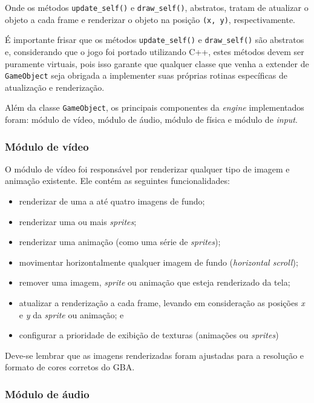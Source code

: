     Onde os métodos \texttt{update\_self()} e \texttt{draw\_self()}, abstratos, tratam de atualizar o objeto a cada frame e renderizar o objeto na posição \texttt{(x, y)}, respectivamente.

    É importante frisar que os métodos \texttt{update\_self()} e \texttt{draw\_self()} são abstratos e, considerando que o jogo foi portado utilizando C++, estes métodos devem ser puramente virtuais, pois isso garante que qualquer classe que venha a extender de \texttt{GameObject} seja obrigada a implementer suas próprias rotinas específicas de atualização e renderização.

    Além da classe \texttt{GameObject}, os principais componentes da \textit{engine} implementados foram: módulo de vídeo, módulo de áudio, módulo de física e módulo de \textit{input}.

    \subsubsection{Módulo de vídeo}

      O módulo de vídeo foi responsável por renderizar qualquer tipo de imagem e animação existente. Ele contém as seguintes funcionalidades:

      \begin{itemize}
        \item renderizar de uma a até quatro imagens de fundo;
        \item renderizar uma ou mais \textit{sprites};
        \item renderizar uma animação (como uma série de \textit{sprites});
        \item movimentar horizontalmente qualquer imagem de fundo (\textit{horizontal scroll});
        \item remover uma imagem, \textit{sprite} ou animação que esteja renderizado da tela;
        \item atualizar a renderização a cada frame, levando em consideração as posições \textit{x} e \textit{y} da \textit{sprite} ou animação; e
        \item configurar a prioridade de exibição de texturas (animações ou \textit{sprites})
      \end{itemize}

      Deve-se lembrar que as imagens renderizadas foram ajustadas para a resolução e formato de cores corretos do GBA.

    \subsubsection{Módulo de áudio}

